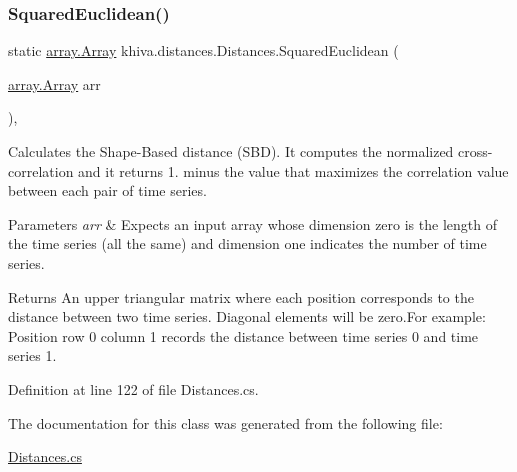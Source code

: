 \subsubsection{\texorpdfstring{Squared\+Euclidean()}{SquaredEuclidean()}}
{\footnotesize\ttfamily static \mbox{\hyperlink{classkhiva_1_1array_1_1_array}{array.\+Array}} khiva.\+distances.\+Distances.\+Squared\+Euclidean (\begin{DoxyParamCaption}\item[{\mbox{\hyperlink{classkhiva_1_1array_1_1_array}{array.\+Array}}}]{arr }\end{DoxyParamCaption})\hspace{0.3cm}{\ttfamily [inline]}, {\ttfamily [static]}}



Calculates the Shape-\/\+Based distance (S\+BD). It computes the normalized cross-\/correlation and it returns 1. minus the value that maximizes the correlation value between each pair of time series. 


\begin{DoxyParams}{Parameters}
{\em arr} & Expects an input array whose dimension zero is the length of the time series (all the same) and dimension one indicates the number of time series.\\
\hline
\end{DoxyParams}
\begin{DoxyReturn}{Returns}
An upper triangular matrix where each position corresponds to the distance between two time series. Diagonal elements will be zero.\+For example\+: Position row 0 column 1 records the distance between time series 0 and time series 1.
\end{DoxyReturn}


Definition at line 122 of file Distances.\+cs.



The documentation for this class was generated from the following file\+:\begin{DoxyCompactItemize}
\item 
\mbox{\hyperlink{_distances_8cs}{Distances.\+cs}}\end{DoxyCompactItemize}
